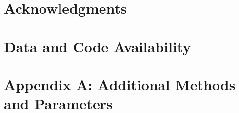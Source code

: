 \documentclass[11pt]{article}
\begin{document}
\section*{Acknowledgments}


\section*{Data and Code Availability}

\section*{Appendix A: Additional Methods and Parameters}

%
%
%
%

\renewcommand{\theequation}{A\arabic{equation}}
\renewcommand{\thetable}{A\arabic{table}}
\setcounter{equation}{0}  %
\setcounter{figure}{0}
\setcounter{table}{0}

%
%


\end{document}
